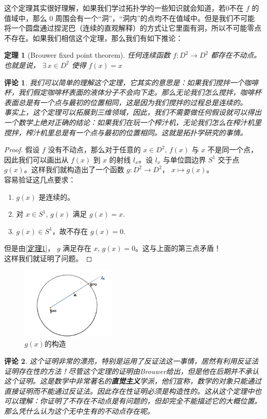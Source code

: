 \documentclass[UTF8,oneside,11pt]{book}
\theoremstyle{plain}\newtheorem{thm}{定理}[chapter]
\theoremstyle{definition}\newtheorem{definition}[thm]{定义}
\theoremstyle{plain}\newtheorem{axiom}[thm]{公理}
\theoremstyle{plain}\newtheorem{coro}[thm]{推论}
\theoremstyle{plain}\newtheorem{lemma}[thm]{引理}
\theoremstyle{plain}\newtheorem{prop}[thm]{性质}
\theoremstyle{plain}\newtheorem{conj}[thm]{猜想}
\theoremstyle{plain}\newtheorem{ques}[thm]{问题}
\theoremstyle{plain}\newtheorem{const}[thm]{构造}
\theoremstyle{remark}\newtheorem{notation}[thm]{注记}
\theoremstyle{plain}\newtheorem*{app}{应用}
\theoremstyle{plain}\newtheorem*{exam}{测试}
\theoremstyle{plain}\newtheorem*{exer}{例子}
\theoremstyle{plain}\newtheorem*{remark}{评论}
\theoremstyle{remark}\newtheorem*{note}{\small{注}}
\numberwithin{equation}{section}
\numberwithin{thm}{chapter}
\begin{document}
这个定理其实很好理解，如果我们学过拓扑学的一些知识就会知道，若0不在 $ f  $ 的值域中，那么 $ 0 $ 周围会有一个“洞”，“洞内”的点均不在值域中。但是我们不可能将一个圆盘通过捏泥巴（连续的直观解释）的方式让它里面有洞，所以不可能零点不存在。如果我们相信这个定理，那么我们有如下推论：
\begin{thm}[Brouwer fixed point theorem]
    任何连续函数 $ f:D^2\rightarrow D^2  $ 都存在不动点。也就是说， $ \exists \,x\in D^2 $ 使得 $ f(x)=x $ 
\end{thm}
\begin{remark}
    我们可以简单的理解这个定理，它其实的意思是：如果我们搅拌一个咖啡杯，我们假定咖啡杯表面的液体分子不会向下走。那么无论我们怎么搅拌，咖啡杯表面总是有一个点与最初的位置相同，这是因为我们搅拌的过程总是连续的。\\
    事实上，这个定理可以拓展到三维领域，因此，我们不需要做任何假设就可以得出一个数学上绝对正确的结论：如果我们在玩一个榨汁机，无论我们怎么在榨汁机里搅拌，榨汁机里总是有一个点与最初的位置相同。这就是拓扑学研究的事情。
\end{remark}
\begin{proof}
    假设 $ f  $ 没有不动点，那么对于任意的 $ x\in D^2 $,  $ f(x)  $ 与 $ x  $ 不是同一个点，因此我们可以画出从 $ f(x) $ 到 $ x  $ 的射线 $ l_x $。设 $ l_x  $ 与单位圆边界 $ S^1 $ 交于点 $ g(x) $。这样我们就构造出了一个函数 $ g:D^2\rightarrow D^2  $， $  x\mapsto g(x) $。\\
    容易验证这几点要求：
    \begin{enumerate}
        \item $ g(x) $ 是连续的。
        \item 对 $ x\in S^1 $, $ g(x) $ 满足 $ g(x)=x $.
        \item  $ g(x)\in S^1 $，故不存在 $ g(x)=0 $.  
    \end{enumerate}  
    但是由\cref{定理1}， $ g  $ 满足存在 $ x $,  $ g(x)=0 $。这与上面的第三点矛盾！\\
    这样我们就证明了问题。   
\end{proof}
\begin{figure}[htb]
    \centering
    \includegraphics[width=0.4\textwidth]{Brouwer.jpg}
    \caption{$ g(x) $的构造}
    \label{Brouwer定理}
\end{figure}
\begin{remark}
    这个证明非常的漂亮，特别是运用了反证法这一事情，居然有利用反证法证明存在性的方法！尽管这个定理的证明由Brouwer给出，但是他在后期并不承认这个证明。这是数学中非常著名的\textbf{直觉主义}学派，他们宣称，数学的对象只能通过直接证明而不能通过反证法。因此存在性证明必须是构造性的。这从这个定理中也可以理解：你证明了不存在不动点是有问题的，但却完全不能描述它的大概位置。那么凭什么认为这个无中生有的不动点存在呢。
\end{remark}
\end{document}
